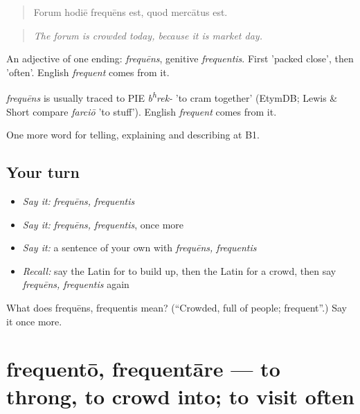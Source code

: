 \begin{quote}
Forum hodiē frequēns est, quod mercātus est.
\end{quote}

\begin{quote}
\emph{The forum is crowded today, because it is market day.}
\end{quote}

An adjective of one ending: \emph{frequēns}, genitive \emph{frequentis}. First 'packed close', then 'often'. English \emph{frequent} comes from it.

\begin{cousinweb}
\emph{frequēns} is usually traced to PIE \emph{b\textsuperscript{h}rek-} 'to cram together' (EtymDB; Lewis \& Short compare \emph{farciō} 'to stuff'). English \emph{frequent} comes from it.
\end{cousinweb}

\begin{grammarlens}[title={What you've built}]
One more word for telling, explaining and describing at B1.
\end{grammarlens}

\subsection*{Your turn}
\begin{itemize}
\raggedright
  \item \emph{Say it:} \emph{frequēns, frequentis}
  \item \emph{Say it:} \emph{frequēns, frequentis}, once more
  \item \emph{Say it:} a sentence of your own with \emph{frequēns, frequentis}
  \item \emph{Recall:} say the Latin for to build up, then the Latin for a crowd, then say \emph{frequēns, frequentis} again
\end{itemize}

\begin{tcolorbox}[breakable,colback=teal!4,colframe=teal!35!black,title={Before you move on}]
What does frequēns, frequentis mean? (\textquotedblleft{}Crowded, full of people; frequent\textquotedblright{}.) Say it once more.
\end{tcolorbox}
\section[frequentō, frequentāre]{frequentō, frequentāre — to throng, to crowd into; to visit often}

